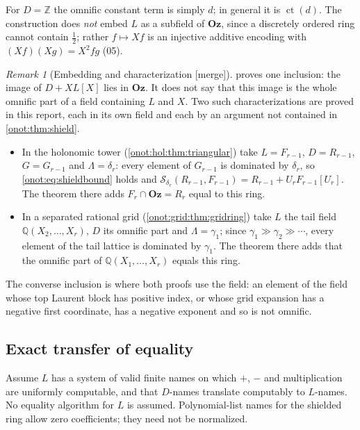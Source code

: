 \documentclass[11pt,oneside]{article}
\numberwithin{equation}{section}
\theoremstyle{definition}
\theoremstyle{remark}
\newtheorem{remark}[remark]{Remark}
\newcommand{\Oz}{\mathbf{Oz}}
\newcommand{\Z}{\mathbb Z}
\newcommand{\Q}{\mathbb Q}
\newcommand{\ct}{\operatorname{ct}}
\newcommand{\mergetag}{\textup{\textsf{\small[merge]}}}
\begin{document}
For $D=\Z$ the omnific constant term is simply $d$; in general it is $\ct(d)$.
The construction does \emph{not} embed $L$ as a subfield of $\Oz$, since a
discretely ordered ring cannot contain $\tfrac12$; rather $f\mapsto Xf$ is an
injective additive encoding with $(Xf)(Xg)=X^2fg$ (05).

\begin{remark}[Embedding and characterization \mergetag]\label{onot:rem:characterizations}
 proves one inclusion: the image of $D+XL[X]$ lies in
$\Oz$. It does not say that this image is the whole omnific part of a field
containing $L$ and $X$. Two such characterizations are proved in this report,
each in its own field and each by an argument not contained in
\cref{onot:thm:shield}.
\begin{itemize}[leftmargin=*]
\item In the holonomic tower (\cref{onot:hol:thm:triangular}) take
$L=F_{r-1}$, $D=R_{r-1}$, $G=G_{r-1}$ and $\Lambda=\delta_r$: every element of
$G_{r-1}$ is dominated by $\delta_r$, so \eqref{onot:eq:shieldbound} holds and
$\mathcal S_{\delta_r}(R_{r-1},F_{r-1})=R_{r-1}+U_rF_{r-1}[U_r]$. The theorem
there adds $F_r\cap\Oz=R_r$ equal to this ring.
\item In a separated rational grid (\cref{onot:grid:thm:gridring}) take $L$ the
tail field $\Q(X_2,\ldots,X_r)$, $D$ its omnific part and $\Lambda=\gamma_1$;
since $\gamma_1\gg\gamma_2\gg\cdots$, every element of the tail lattice is
dominated by $\gamma_1$. The theorem there adds that the omnific part of
$\Q(X_1,\ldots,X_r)$ equals this ring.
\end{itemize}
The converse inclusion is where both proofs use the field: an element of the
field whose top Laurent block has positive index, or whose grid expansion has a
negative first coordinate, has a negative exponent and so is not omnific.
\end{remark}

\subsection{Exact transfer of equality}

Assume $L$ has a system of valid finite names on which $+$, $-$ and
multiplication are uniformly computable, and that $D$-names translate computably
to $L$-names. No equality algorithm for $L$ is assumed. Polynomial-list names for
the shielded ring allow zero coefficients; they need not be normalized.
\end{document}
